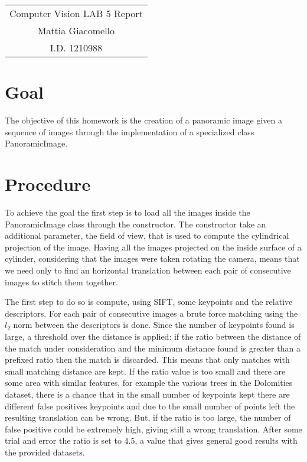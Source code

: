 \documentclass[12pt,a4paper]{article}
\newcommand{\cc}{\fontfamily{txtt}\selectfont}
\begin{document}
\begin{center}
\begin{tabular}{c}
\LARGE{Computer Vision LAB 5 Report}\\
\large{Mattia Giacomello}\\
I.D. 1210988
\end{tabular}
\end{center}

\section{Goal}
The objective of this homework is the creation of a panoramic image given a sequence of images through the implementation of a specialized class {\cc PanoramicImage}.
\section{Procedure}
To achieve the goal the first step is to load all the images inside the {\cc PanoramicImage} class through the constructor. The constructor take an additional parameter, the field of view, that is used to compute the cylindrical projection of the image. Having all the images projected on the inside surface of a cylinder, considering that the images were taken rotating the camera, means that we need only to find an horizontal translation between each pair of consecutive images to stitch them together. 

The first step to do so is compute, using SIFT, some keypoints and the relative descriptors. For each pair of consecutive images a brute force matching using the $l_2$ norm between the descriptors is done. Since the number of keypoints found is large, a threshold over the distance is applied: if the ratio between the distance of the match under consideration and the minimum distance found is greater than a prefixed {\cc ratio} then the match is discarded. This means that only matches with small matching distance are kept. If the {\cc ratio} value is too small and there are some area with similar features, for example the various trees in the Dolomities dataset, there is a chance that in the small number of keypoints kept there are different false positives keypoints and due to the small number of points left the resulting translation can be wrong. But, if the ratio is too large, the number of false positive could be extremely high, giving still a wrong translation. After some trial and error the {\cc ratio} is set to 4.5, a value that gives general good results with the provided datasets.
\end{document}
